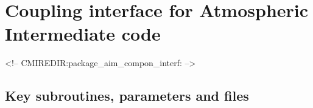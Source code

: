 \section{Coupling interface for Atmospheric Intermediate code}
\label{sec:pkg:aim_compon_interf}
\begin{rawhtml}
<!-- CMIREDIR:package_aim_compon_interf: -->
\end{rawhtml}

\subsection{Key subroutines, parameters and files}
\label{sec:pkg:aim_compon_interf:implementation_synopsis}

